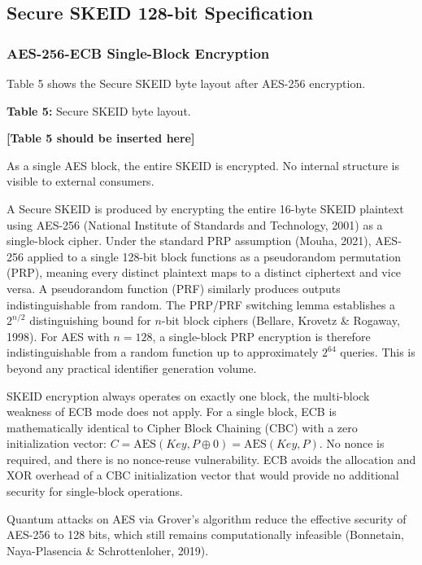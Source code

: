 \documentclass[fleqn,10pt,lineno]{wlpeerj}
\begin{document}
\subsection{Secure SKEID 128-bit
Specification}\label{secure-skeid-128-bit-specification}

\subsubsection{AES-256-ECB Single-Block
Encryption}\label{aes-256-ecb-single-block-encryption}

Table 5 shows the Secure SKEID byte layout after AES-256 encryption.

\textbf{Table 5:} Secure SKEID byte layout.

\textbf{{[}Table 5 should be inserted here{]}}

As a single AES block, the entire SKEID is encrypted. No internal
structure is visible to external consumers.

A Secure SKEID is produced by encrypting the entire 16-byte SKEID
plaintext using AES-256 (National Institute of Standards and Technology,
2001) as a single-block cipher. Under the standard PRP assumption
(Mouha, 2021), AES-256 applied to a single 128-bit block functions as a
pseudorandom permutation (PRP), meaning every distinct plaintext maps to
a distinct ciphertext and vice versa. A pseudorandom function (PRF)
similarly produces outputs indistinguishable from random. The PRP/PRF
switching lemma establishes a \(2^{n/2}\) distinguishing bound for
\(n\)-bit block ciphers (Bellare, Krovetz \& Rogaway, 1998). For AES
with \(n = 128\), a single-block PRP encryption is therefore
indistinguishable from a random function up to approximately \(2^{64}\)
queries. This is beyond any practical identifier generation volume.

SKEID encryption always operates on exactly one block, the multi-block
weakness of ECB mode does not apply. For a single block, ECB is
mathematically identical to Cipher Block Chaining (CBC) with a zero
initialization vector:
\(C = \text{AES}(Key, P \oplus 0) = \text{AES}(Key, P)\). No nonce is
required, and there is no nonce-reuse vulnerability. ECB avoids the
allocation and XOR overhead of a CBC initialization vector that would
provide no additional security for single-block operations.

Quantum attacks on AES via Grover's algorithm reduce the effective
security of AES-256 to 128 bits, which still remains computationally
infeasible (Bonnetain, Naya-Plasencia \& Schrottenloher, 2019).
\end{document}
